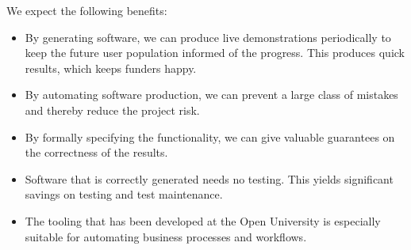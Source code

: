 \documentclass{elsarticle}
\begin{document}
   We expect the following benefits:
\begin{itemize}
    \item By generating software, we can produce live demonstrations periodically to keep the future user population informed of the progress.
    This produces quick results, which keeps funders happy.
    \item By automating software production, we can prevent a large class of mistakes and thereby reduce the project risk.
    \item By formally specifying the functionality, we can give valuable guarantees on the correctness of the results.
    \item Software that is correctly generated needs no testing. This yields significant savings on testing and test maintenance.
    \item The tooling that has been developed at the Open University is especially suitable for automating business processes and workflows.
\end{itemize}
\end{document}

